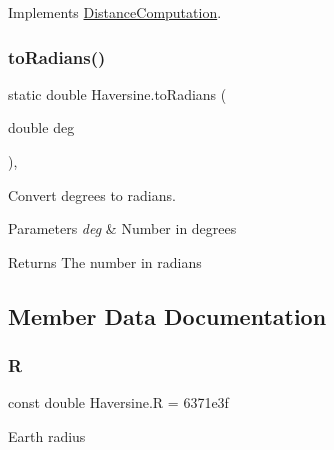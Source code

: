 Implements \hyperlink{classDistanceComputation_ad735d72f479e7114a528b3404ea83a33}{Distance\+Computation}.

\mbox{\label{classHaversine_a0ed23bed06e7e27cc8e8ad43cc7c5bb1}} 
\subsubsection{\texorpdfstring{to\+Radians()}{toRadians()}}
{\footnotesize\ttfamily static double Haversine.\+to\+Radians (\begin{DoxyParamCaption}\item[{double}]{deg }\end{DoxyParamCaption})\hspace{0.3cm}{\ttfamily [inline]}, {\ttfamily [static]}}



Convert degrees to radians. 


\begin{DoxyParams}{Parameters}
{\em deg} & Number in degrees\\
\hline
\end{DoxyParams}
\begin{DoxyReturn}{Returns}
The number in radians
\end{DoxyReturn}


\subsection{Member Data Documentation}
\mbox{\label{classHaversine_a9f083aeda060fe62bb7aec4fb1ab59df}} 
\subsubsection{\texorpdfstring{R}{R}}
{\footnotesize\ttfamily const double Haversine.\+R = 6371e3f\hspace{0.3cm}{\ttfamily [private]}}



Earth radius

\mbox{\label{classHaversine_a841876caac549e822374daec9a9b95ab}} 
